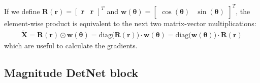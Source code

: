 If we define $\bm R(\bm{r})= \begin{bmatrix}\bm{r}&\bm r\end{bmatrix}^T$ and $\bm w(\bm\theta)=\begin{bmatrix}\cos(\bm{\theta})&\sin(\bm{\theta})\end{bmatrix}^T$, the element-wise product is equivalent to the next two matrix-vector multiplications:
\begin{align}
	\bm\tilde{X}=\bm R(\bm{r})\odot\bm w(\bm\theta)
	=\text{diag}\bigl(\bm R(\bm{r})\bigr)\cdot \bm w(\bm\theta)
	=\text{diag}\bigl(\bm w(\bm\theta)\bigr)\cdot\bm R(\bm{r})
\end{align}
which are useful to calculate the gradients.


\subsection{Magnitude DetNet block}

